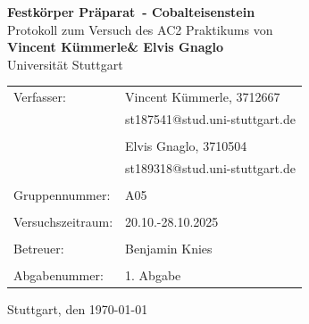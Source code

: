 \documentclass[a4paper,12pt,bibliography=totocnumbered]{scrartcl}
\makeatletter
\newcommand{\VERSUCHSDATUM}{20.10.-28.10.2025}
\newcommand{\PROTOKOLLDATUM}{\today}
\newcommand{\VerfasserEINS}{Vincent Kümmerle}
\newcommand{\MatNoEINS}{3712667}
\newcommand{\EmailEINS}{st187541@stud.uni-stuttgart.de}
\newcommand{\VerfasserZWEI}{Elvis Gnaglo}
\newcommand{\MatNoZWEI}{3710504}
\newcommand{\EmailZWEI}{st189318@stud.uni-stuttgart.de}
\newcommand{\BETREUER}{Benjamin Knies}
\newcommand{\GRUPPENNR}{A05}
\newcommand{\VERSUCHSNR}{Festkörper Präparat}
\newcommand{\VERSUCHSNAME}{Cobalteisenstein}
\makeatother
\begin{document}
\thispagestyle{empty}


\begin{titlepage}

\begin{center}
\Huge{\textbf{\VERSUCHSNR\ - \VERSUCHSNAME}}\\
\vspace{10mm}%
\Large{Protokoll zum Versuch des AC2 Praktikums von \\ \textbf{\VerfasserEINS\;\& \VerfasserZWEI}}\\
\vspace{10mm} 
\Large{Universität Stuttgart}\\
\end{center}
\vspace{1cm}
\begin{center}
\begin{tabular}{ll}
\large{Verfasser:}		& \large{\VerfasserEINS,} \large{\MatNoEINS} \\
 						& \large{\EmailEINS} \\
 						\vspace{0cm}\\
						& \large{\VerfasserZWEI,} \large{\MatNoZWEI} \\
                        & \large{\EmailZWEI} \\
						\vspace{0cm}\\
\large{Gruppennummer:}	& \large{\GRUPPENNR} \\
\vspace{0cm}\\
\large{Versuchszeitraum:}	& \large{\VERSUCHSDATUM} \\
\vspace{0cm}\\
\large{Betreuer:}		& \large{\BETREUER} \\
\vspace{0cm}\\
\large{Abgabenummer:} & \large{1. Abgabe}
\end{tabular}
\end{center}
\vspace{15mm}

\begin{center}
Stuttgart, den \PROTOKOLLDATUM
\end{center}

\end{titlepage}


\thispagestyle{empty}

\tableofcontents 
\end{document}
